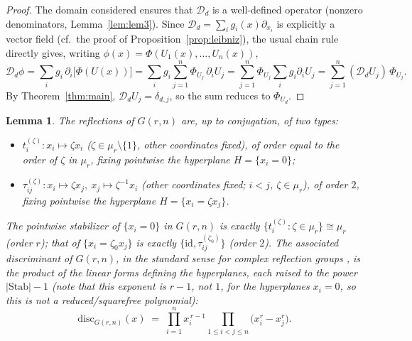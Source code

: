 \documentclass[11pt]{article}
\newtheorem{lemma}[theorem]{Lemma}
\theoremstyle{remark}
\begin{document}
\begin{proof}
The domain considered ensures that $\mathcal D_d$ is a well-defined operator (nonzero denominators, Lemma~\ref{lem:lem3}). Since $\mathcal D_d=\sum_ig_i(x)\partial_{x_i}$ is explicitly a vector field (cf.\ the proof of Proposition~\ref{prop:leibniz}), the usual chain rule directly gives, writing $\phi(x)=\Phi(U_1(x),\dots,U_n(x))$,
\[
\mathcal D_d\phi = \sum_i g_i\,\partial_i\big[\Phi(U(x))\big] = \sum_i g_i\sum_{j=1}^n \Phi_{U_j}\,\partial_iU_j = \sum_{j=1}^n \Phi_{U_j}\sum_i g_i\partial_iU_j = \sum_{j=1}^n (\mathcal D_dU_j)\,\Phi_{U_j}.
\]
By Theorem~\ref{thm:main}, $\mathcal D_dU_j=\delta_{d,j}$, so the sum reduces to $\Phi_{U_d}$.
\end{proof}

\begin{lemma}\label{lem:disc}
The reflections of $G(r,n)$ are, up to conjugation, of two types:
\begin{itemize}
\item $t_i^{(\zeta)}: x_i\mapsto \zeta x_i$ ($\zeta\in\mu_r\setminus\{1\}$, other coordinates fixed), of order equal to the order of $\zeta$ in $\mu_r$, fixing pointwise the hyperplane $H=\{x_i=0\}$;
\item $\tau_{ij}^{(\zeta)}: x_i\mapsto \zeta x_j,\ x_j\mapsto \zeta^{-1}x_i$ (other coordinates fixed; $i<j$, $\zeta\in\mu_r$), of order $2$, fixing pointwise the hyperplane $H=\{x_i=\zeta x_j\}$.
\end{itemize}
The pointwise stabilizer of $\{x_i=0\}$ in $G(r,n)$ is exactly $\{t_i^{(\zeta)}:\zeta\in\mu_r\}\cong\mu_r$ (order $r$); that of $\{x_i=\zeta_0x_j\}$ is exactly $\{\mathrm{id},\tau_{ij}^{(\zeta_0)}\}$ (order $2$). The associated discriminant of $G(r,n)$, in the standard sense for complex reflection groups \cite[Ch.~2]{LT}, is the product of the linear forms defining the hyperplanes, each raised to the power $|\mathrm{Stab}|-1$ (note that this exponent is $r-1$, not $1$, for the hyperplanes $x_i=0$, so this is \emph{not} a reduced/squarefree polynomial):
\[
\mathrm{disc}_{G(r,n)}(x) \;=\; \prod_{i=1}^n x_i^{\,r-1} \prod_{1\le i<j\le n} \big(x_i^r - x_j^r\big).
\]
\end{lemma}
\end{document}
